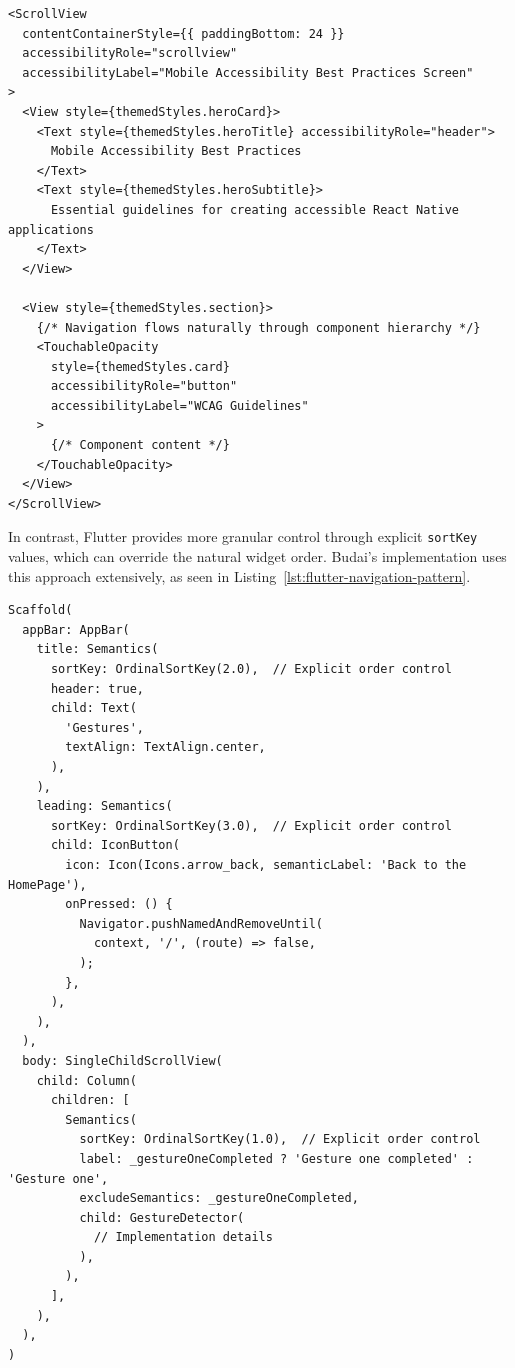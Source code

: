 \begin{lstlisting}[style=ReactNativeStyle, caption=Navigation order in React Native, label=lst:react-native-navigation-pattern]
<ScrollView
  contentContainerStyle={{ paddingBottom: 24 }}
  accessibilityRole="scrollview"
  accessibilityLabel="Mobile Accessibility Best Practices Screen"
>
  <View style={themedStyles.heroCard}>
    <Text style={themedStyles.heroTitle} accessibilityRole="header">
      Mobile Accessibility Best Practices
    </Text>
    <Text style={themedStyles.heroSubtitle}>
      Essential guidelines for creating accessible React Native applications
    </Text>
  </View>
  
  <View style={themedStyles.section}>
    {/* Navigation flows naturally through component hierarchy */}
    <TouchableOpacity 
      style={themedStyles.card}
      accessibilityRole="button" 
      accessibilityLabel="WCAG Guidelines"
    >
      {/* Component content */}
    </TouchableOpacity>
  </View>
</ScrollView>
\end{lstlisting}

\pagebreak

In contrast, Flutter provides more granular control through explicit \texttt{sortKey} values, which can override the natural widget order. Budai's implementation uses this approach extensively, as seen in Listing~\ref{lst:flutter-navigation-pattern}.

\begin{lstlisting}[style=DartStyle, caption=Navigation order in Flutter, label=lst:flutter-navigation-pattern]
Scaffold(
  appBar: AppBar(
    title: Semantics(
      sortKey: OrdinalSortKey(2.0),  // Explicit order control
      header: true,
      child: Text(
        'Gestures',
        textAlign: TextAlign.center,
      ),
    ),
    leading: Semantics(
      sortKey: OrdinalSortKey(3.0),  // Explicit order control
      child: IconButton(
        icon: Icon(Icons.arrow_back, semanticLabel: 'Back to the HomePage'),
        onPressed: () {
          Navigator.pushNamedAndRemoveUntil(
            context, '/', (route) => false,
          );
        },
      ),
    ),
  ),
  body: SingleChildScrollView(
    child: Column(
      children: [
        Semantics(
          sortKey: OrdinalSortKey(1.0),  // Explicit order control
          label: _gestureOneCompleted ? 'Gesture one completed' : 'Gesture one',
          excludeSemantics: _gestureOneCompleted,
          child: GestureDetector(
            // Implementation details
          ),
        ),
      ],
    ),
  ),
)
\end{lstlisting}


